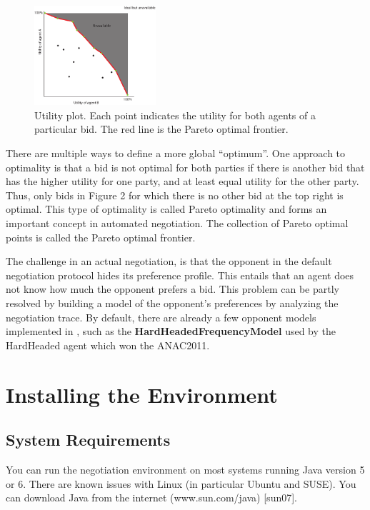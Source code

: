 \documentclass[]{article}
\begin{document}
\begin{figure}[htb]
	\centering
	\includegraphics[width=0.4\textwidth]{media/image5.pdf}
\caption{Utility plot. Each point indicates the utility for both agents of a particular bid. The red line is the Pareto optimal frontier.}\label{Fig:utility plot}
\end{figure}

There are multiple ways to define a more global ``optimum''. One approach to optimality is that a bid is not optimal for both parties if there is another bid that has the higher utility for one party, and at least equal utility for the other party. Thus, only bids in Figure 2 for which there is no other bid at the top right is optimal. This type of optimality is called Pareto optimality and forms an important concept in automated negotiation. The collection of Pareto optimal points is called the Pareto optimal frontier.

The challenge in an actual negotiation, is that the opponent in the default negotiation protocol hides its preference profile. This entails that an agent does not know how much the opponent prefers a bid. This problem can be partly resolved by building a model of the opponent's preferences by analyzing the negotiation trace. By default, there are already a few opponent models implemented in \Genius, such as the \textbf{HardHeadedFrequencyModel} used by the HardHeaded agent which won the ANAC2011.
 
\section{Installing the Environment}

\subsection{System Requirements}
You can run the negotiation environment on most systems running Java version 5 or 6. There are known issues with Linux (in particular Ubuntu and SUSE). You can download Java from the internet (www.sun.com/java) [sun07]. 
\end{document}
